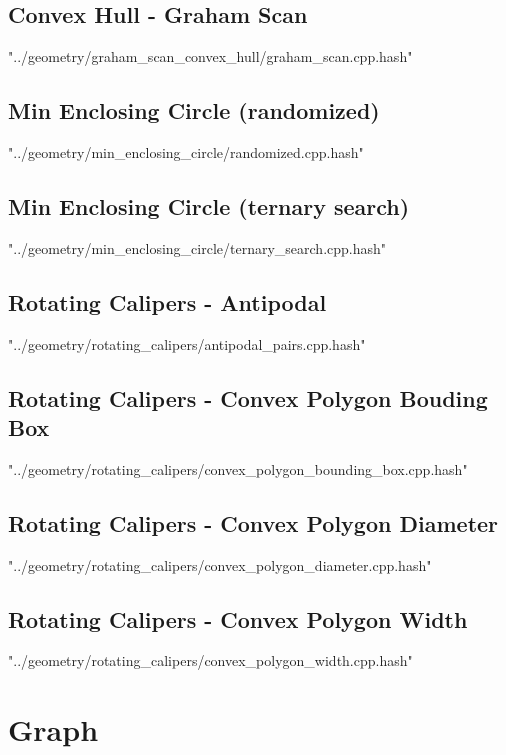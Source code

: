 \documentclass [a4paper,5pt,oneside, landscape]{article}
\begin{document}
\begin{multicols}{3}
\subsection{ Convex Hull - Graham Scan}
 {"../geometry/graham_scan_convex_hull/graham_scan.cpp.hash"}


\subsection{ Min Enclosing Circle (randomized)}
 {"../geometry/min_enclosing_circle/randomized.cpp.hash"}


\subsection{ Min Enclosing Circle (ternary search)}
 {"../geometry/min_enclosing_circle/ternary_search.cpp.hash"}


\subsection{ Rotating Calipers - Antipodal}
 {"../geometry/rotating_calipers/antipodal_pairs.cpp.hash"}


\subsection{ Rotating Calipers - Convex Polygon Bouding Box}
 {"../geometry/rotating_calipers/convex_polygon_bounding_box.cpp.hash"}


\subsection{ Rotating Calipers - Convex Polygon Diameter}
 {"../geometry/rotating_calipers/convex_polygon_diameter.cpp.hash"}


\subsection{ Rotating Calipers - Convex Polygon Width}
 {"../geometry/rotating_calipers/convex_polygon_width.cpp.hash"}



\section{Graph}

\end{multicols}
\end{document}
